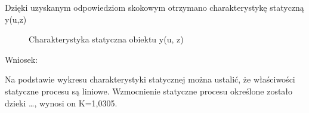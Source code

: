 Dzięki uzyskanym odpowiedziom skokowym otrzymano charakterystykę statyczną y(u,z)

\begin{figure}[H] 
    \centering
    
    \caption{Charakterystyka statyczna obiektu y(u, z)}
    \label{projekt:zad2:charStat:figure}
\end{figure}

Wniosek: 

Na podstawie wykresu charakterystyki statycznej można ustalić, że właściwości
statyczne procesu są liniowe. Wzmocnienie statyczne procesu określone zostało dzieki …,
wynosi on K=1,0305.
